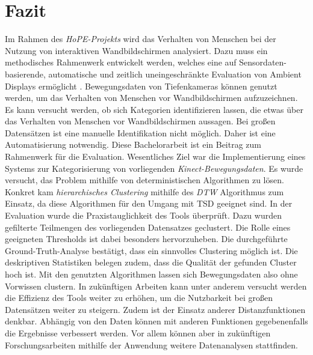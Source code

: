 \chapter{Fazit}
\label{chapter7}
Im Rahmen des \emph{HoPE-Projekts} wird das Verhalten von Menschen
bei der Nutzung von interaktiven Wandbildschirmen analysiert.
Dazu muss ein methodisches Rahmenwerk entwickelt werden, welches eine auf Sensordaten-basierende,
automatische und zeitlich uneingeschränkte Evaluation von Ambient Displays ermöglicht \citep{unibw_honeypot-effekt_2021}.
Bewegungsdaten von Tiefenkameras können genutzt werden,
um das Verhalten von Menschen vor Wandbildschirmen aufzuzeichnen.
Es kann versucht werden, ob sich Kategorien identifizieren lassen,
die etwas über das Verhalten von Menschen vor Wandbildschirmen aussagen.
Bei großen Datensätzen ist eine manuelle Identifikation nicht möglich.
Daher ist eine Automatisierung notwendig.
Diese Bachelorarbeit ist ein Beitrag zum Rahmenwerk für die Evaluation.
Wesentliches Ziel war die Implementierung eines Systems zur Kategorisierung von vorliegenden \emph{Kinect-Bewegungsdaten}.
Es wurde versucht, das Problem mithilfe von deterministischen Algorithmen zu lösen.
Konkret kam \emph{hierarchisches Clustering} mithilfe des \emph{\ac{DTW}} Algorithmus zum Einsatz,
da diese Algorithmen für den Umgang mit \ac{TSD} geeignet sind.
In der Evaluation wurde die Praxistauglichkeit des Tools überprüft.
Dazu wurden gefilterte Teilmengen des vorliegenden Datensatzes geclustert.
Die Rolle eines geeigneten Thresholds ist dabei besonders hervorzuheben.
Die durchgeführte Ground-Truth-Analyse bestätigt, dass ein sinnvolles Clustering möglich ist.
Die deskriptiven Statistiken belegen zudem, dass die Qualität der gefunden Cluster hoch ist.
Mit den genutzten Algorithmen lassen sich Bewegungsdaten also ohne Vorwissen clustern.
In zukünftigen Arbeiten kann unter anderem versucht werden die Effizienz des Tools weiter zu erhöhen,
um die Nutzbarkeit bei großen Datensätzen weiter zu steigern.
Zudem ist der Einsatz anderer Distanzfunktionen denkbar.
Abhängig von den Daten können mit anderen Funktionen gegebenenfalls die Ergebnisse verbessert werden.
Vor allem können aber in zukünftigen Forschungsarbeiten mithilfe der Anwendung weitere Datenanalysen stattfinden.